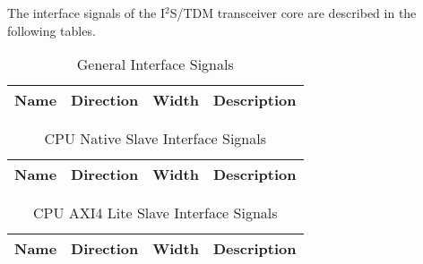 \label{sec:is}

The interface signals of the I$^{2}$S/TDM transceiver core are described in the following tables.

\begin{table}[H]
  \centering
  \begin{tabular}{|l|l|r|p{10.5cm}|}
    
    \hline
    \rowcolor{iob-green}
    {\bf Name} & {\bf Direction} & {\bf Width} & {\bf Description}  \\ \hline \hline

    
 
  \end{tabular}
  \caption{General Interface Signals}
  \label{gen_is_tab:is}
\end{table}

\begin{table}[H]
  \centering
  \begin{tabular}{|l|l|r|p{10.5cm}|}
    
    \hline
    \rowcolor{iob-green}
    {\bf Name} & {\bf Direction} & {\bf Width} & {\bf Description}  \\ \hline \hline

    
 
  \end{tabular}
  \caption{CPU Native Slave Interface Signals}
  \label{cpu_nat_s_is_tab:is}
\end{table}
\clearpage

\begin{table}[H]
  \centering
  \begin{tabular}{|l|l|r|p{9.5cm}|}
    
    \hline
    \rowcolor{iob-green}
    {\bf Name} & {\bf Direction} & {\bf Width} & {\bf Description}  \\ \hline \hline

    
 
  \end{tabular}
  \caption{CPU AXI4 Lite Slave Interface Signals}
  \label{cpu_axi4lite_s_is_tab:is}
\end{table}

